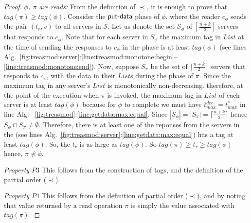 \begin{proof}
\emph{ $\phi$, $\pi$ are reads:}
From  the definition of $\prec$, it is enough to prove that $tag(\pi) \geq tag(\phi)$. Consider the $\act{put-data}$ phase of $\phi$, where the reader $c_{\phi}$ sends the pair $(t_r, v)$ to all 
servers in $\mathcal{S}$. Let us denote the  set $\mathcal{S}_{\phi} $ of $\left\lceil \frac{n+k}{2} \right\rceil$ servers  that responds to $c_{\phi}$.  Note that for each server in $S_{\phi}$ the maximum tag in $List$ at the time of 
sending the responses to $c_{\phi}$ in the   phase is at least $tag(\phi)$ 
(see  lines  Alg.~\ref{fig:treasmod:server}:\ref{line:treasmod:monotone:begin}--\ref{line:treasmod:monotone:end}). 
Now, suppose $S_{\pi}$ be 
the set of $\lceil \frac{n+k}{2} \rceil$ servers that responds to $c_{\pi}$, with the data in their
 $List$s  during the  phase of $\pi$. 
Since the maximum tag in any server's $List$ is monotonically non-decreasing.%
therefore, at the point of the execution when $\pi$ is invoked, the maximum
tag in  $List$ of each server is at least $tag(\phi)$ because for $\phi$ to complete we must have 
$t_{max}^{dec} =  t_{max}^{*}$ in line Alg. ~\ref{fig:treasmod}:\ref{line:getdata:max:equal}.
%
Since $|S_{\phi}| = | S_{\pi}| = \lceil \frac{n+k}{2} \rceil$  hence 
$S_{\phi} \cap S_{\pi} \neq \emptyset $. Therefore, there is at least one of the  reponses from the servers in the 
(see lines Alg.~\ref{fig:treasmod:server}:\ref{line:getdata:max:equal}) has a tag at least $tag(\phi)$. So, the $t_r$ is as large as  $tag(\phi)$. So $tag(\pi) \geq t_r \geq tag(\phi)$ hence, $\pi \not\prec \phi$.



\emph{Property $P3$} This follows from the construction of tags, and the definition of the partial order ($\prec$).

\emph{Property $P4$} This follows from the definition of partial order ($\prec$), and by noting that value returned by a read operation $\pi$ is simply the value associated with $tag(\pi)$.
%
				\end{proof}
				
